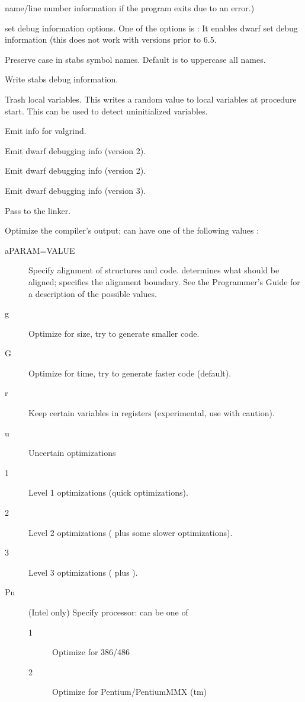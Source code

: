 \begin{description}
name/line number information if the program exits due to an error.)
\item[-goXXX] set debug information options. One of the options is
: It enables dwarf set debug information (this does not work
with  versions prior to 6.5.
\item [-gp] Preserve case in stabs symbol names. Default is to uppercase all
names.
\item [-gs] Write stabs debug information.
\item [-gt] Trash local variables. This writes a random value to local
variables at procedure start. This can be used to detect uninitialized
variables.
\item [-gv] Emit info for valgrind.
\item [-gw] Emit dwarf debugging info (version 2).
\item [-gw2] Emit dwarf debugging info (version 2).
\item [-gw3] Emit dwarf debugging info (version 3).
\item[-kxxx] Pass  to the linker. 
\item[-Oxxx]  Optimize the compiler's output;  can have one
of the following values :
\begin{description}
\item[aPARAM=VALUE] Specify alignment of structures and code. 
determines what should be aligned;  specifies the alignment
boundary. See the Programmer's Guide for a description of the possible
values.
\item[g] Optimize for size, try to generate smaller code.
\item[G] Optimize for time, try to generate faster code (default).
\item[r] Keep certain variables in registers (experimental, use with
caution).
\item[u] Uncertain optimizations
\item[1] Level 1 optimizations (quick optimizations).
\item[2] Level 2 optimizations ( plus some slower optimizations).
\item[3] Level 3 optimizations ( plus ).
\item[Pn] (Intel only) Specify processor:  can be one of
\begin{description}
\item[1] Optimize for 386/486
\item[2] Optimize for Pentium/PentiumMMX (tm)

\end{description}
\end{description}
\end{description}
